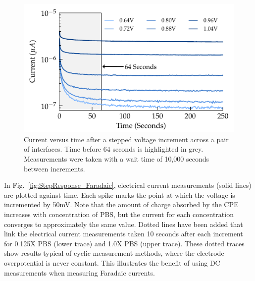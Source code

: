 \documentclass[journal, a4paper]{IEEEtran}
\begin{document}
\begin{figure}
    \begin{center}
        \includegraphics{graphics/CPE_currentVsTime}
    \end{center}
    \caption{Current versus time after a stepped voltage increment across a pair of interfaces. Time before 64 seconds is highlighted in grey. Measurements were taken with a wait time of 10,000 seconds between increments.}
    \label{fig:CPE_currentVsTime}
\end{figure}

In Fig.~\ref{fig:StepResponse_Faradaic}, electrical current measurements (solid lines) are plotted against time. Each spike marks the point at which the voltage is incremented by 50\thinspace mV. Note that the amount of charge absorbed by the CPE increases with concentration of PBS, but the current for each concentration converges to approximately the same value. Dotted lines have been added that link the electrical current measurements taken 10 seconds after each increment for 0.125X PBS (lower trace) and 1.0X PBS (upper trace). These dotted traces show results typical of cyclic {\color{blue} measurement} methods, where the electrode overpotential is never constant. This illustrates the benefit of using DC measurements when measuring Faradaic currents.
\end{document}
